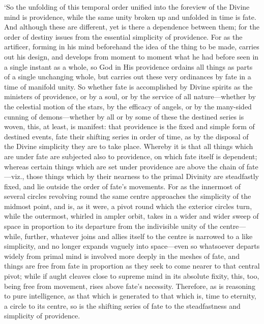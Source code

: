 \documentclass[11pt]{book}
\begin{document}
`So the unfolding of this temporal order unified into the foreview of
the Divine mind is providence, while the same unity broken up and
unfolded in time is fate. And although these are different, yet is there
a dependence between them; for the order of destiny issues from the
essential simplicity of providence. For as the artificer, forming in his
mind beforehand the idea of the thing to be made, carries out his
design, and develops from moment to moment what he had before seen in a
single instant as a whole, so God in His providence ordains all things
as parts of a single unchanging whole, but carries out these very
ordinances by fate in a time of manifold unity. So whether fate is
accomplished by Divine spirits as the ministers of providence, or by a
soul, or by the service of all nature---whether by the celestial motion
of the stars, by the efficacy of angels, or by the many-sided cunning of
demons---whether by all or by some of these the destined series is woven,
this, at least, is manifest: that providence is the fixed and simple
form of destined events, fate their shifting series in order of time, as
by the disposal of the Divine simplicity they are to take place. Whereby
it is that all things which are under fate are subjected also to
providence, on which fate itself is dependent; whereas certain things
which are set under providence are above the chain of fate---viz., those
things which by their nearness to the primal Divinity are steadfastly
fixed, and lie outside the order of fate's movements. For as the
innermost of several circles revolving round the same centre approaches
the simplicity of the midmost point, and is, as it were, a pivot round
which the exterior circles turn, while the outermost, whirled in ampler
orbit, takes in a wider and wider sweep of space in proportion to its
departure from the indivisible unity of the centre---while, further,
whatever joins and allies itself to the centre is narrowed to a like
simplicity, and no longer expands vaguely into space---even so whatsoever
departs widely from primal mind is involved more deeply in the meshes of
fate, and things are free from fate in proportion as they seek to come
nearer to that central pivot; while if aught cleaves close to supreme
mind in its absolute fixity, this, too, being free from movement, rises
above fate's necessity. Therefore, as is reasoning to pure intelligence,
as that which is generated to that which is, time to eternity, a circle
to its centre, so is the shifting series of fate to the steadfastness
and simplicity of providence.
\end{document}
